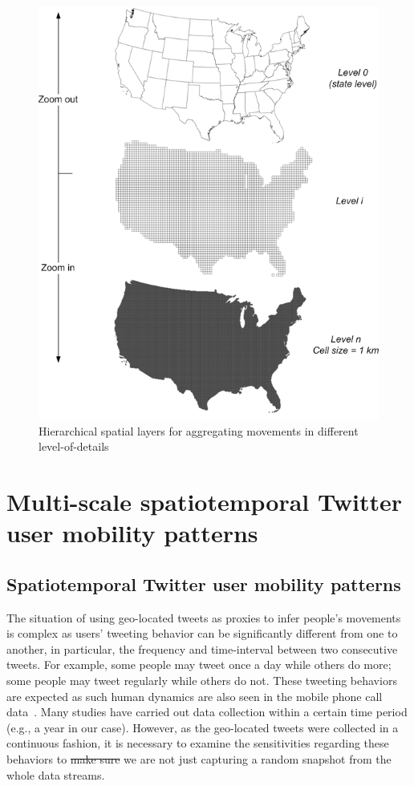 \documentclass[ijgi,article,submit,moreauthors,pdftex,10pt,a4paper]{mdpi}
\theoremstyle{mdpi}
\newcounter{ex}
\newcounter{re}
\theoremstyle{mdpidefinition}
\providecommand{\DIFadd}[1]{{\protect\color{blue}\uwave{#1}}} %
\providecommand{\DIFdel}[1]{{\protect\color{red}\sout{#1}}}                      %
\providecommand{\DIFaddbegin}{} %
\providecommand{\DIFaddend}{} %
\providecommand{\DIFdelbegin}{} %
\providecommand{\DIFdelend}{} %
\providecommand{\DIFaddendFL}{} %
\begin{document}
\DIFdelbegin %
\DIFdelend \DIFaddbegin \begin{figure}[ht]
\DIFaddendFL \centering
\includegraphics[width=0.6\linewidth]{./figures/multilevel}
\caption{Hierarchical spatial layers for aggregating movements in different level-of-details}
\label{fig:multilevel}
\end{figure}
\FloatBarrier

\section{Multi-scale spatiotemporal Twitter user mobility patterns}
\subsection{Spatiotemporal Twitter user mobility patterns}
The situation of using geo-located tweets as proxies to infer people's movements is complex as users' tweeting behavior can be significantly different from one to another, in particular, the frequency and time-interval between two consecutive tweets.
For example, some people may tweet once a day while others do more; some people may tweet regularly while others do not.  
These tweeting behaviors are expected as such human dynamics are also seen in the mobile phone call data~\cite{gonzalez2008understanding}. 
Many studies have carried out data collection within a certain time period (e.g., a year in our case).
However, as the geo-located tweets were collected in a continuous fashion, it is necessary to examine the sensitivities regarding these behaviors to \DIFdelbegin \DIFdel{make sure }\DIFdelend \DIFaddbegin \DIFadd{ensure }\DIFaddend we are not just capturing a random snapshot from the whole data streams. 
\end{document}
